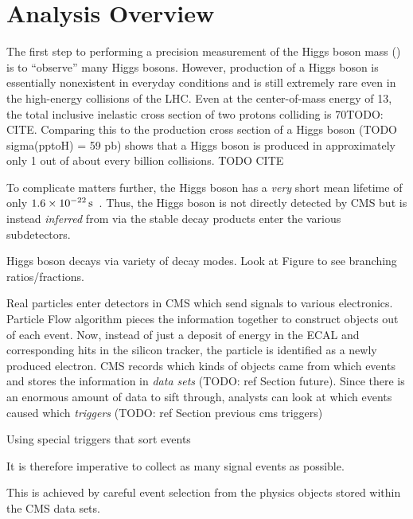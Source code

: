 \section{Analysis Overview}
\label{sec:analysis_overview}
The first step to performing a precision measurement of the Higgs boson mass (\mH) is to ``observe'' many Higgs bosons.
However, production of a Higgs boson is essentially nonexistent in everyday conditions and is still extremely rare even in the high-energy \pp collisions of the LHC.
Even at the center-of-mass energy of 13\TeV, the total inclusive inelastic cross section of two protons colliding is 70\mb TODO: CITE.
Comparing this to the production cross section of a Higgs boson (TODO sigma(pptoH) = 59 pb) shows that a Higgs boson is produced in approximately only 1 out of about every billion \pp collisions.  TODO CITE

To complicate matters further, the Higgs boson has a \emph{very} short mean lifetime of only $1.6 \times \text{10}^\text{$-$22}\,\text{s}$~\cite{pdg}.
Thus, the Higgs boson is not directly detected by CMS but is instead \emph{inferred} from via the stable decay products enter the various subdetectors.


Higgs boson decays via variety of decay modes.
Look at Figure to see branching ratios/fractions.



Real particles enter detectors in CMS which send signals to various electronics.
Particle Flow algorithm pieces the information together to construct objects out of each event.
Now, instead of just a deposit of energy in the ECAL and corresponding hits in the silicon tracker, the particle is identified as a newly produced electron.
CMS records which kinds of objects came from which events and stores the information in \emph{data sets} (TODO: ref Section future).
Since there is an enormous amount of data to sift through, analysts can look at which events caused which \emph{triggers} (TODO: ref Section previous cms triggers)

Using special triggers
that sort events

It is therefore imperative to collect as many signal events as possible.

This is achieved by careful event selection from the physics objects stored within the CMS data sets.

